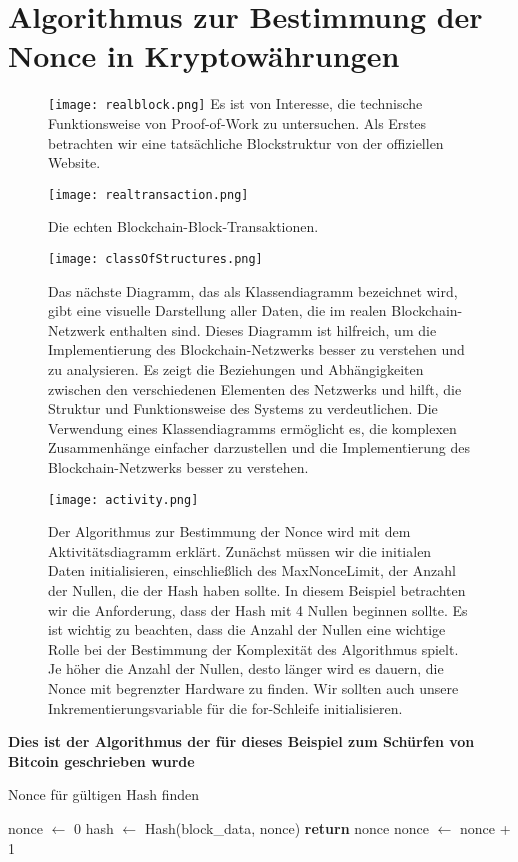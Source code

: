\documentclass[ngerman]{scrreprt}
\begin{document}
\section[Praktische Anwendung der Proof-Of-Work-Methode]{Algorithmus zur Bestimmung der Nonce in Kryptowährungen}
\begin{figure}[H]
	\texttt{[image: realblock.png]}
	\small{Es ist von Interesse, die technische Funktionsweise von Proof-of-Work zu untersuchen. Als Erstes betrachten wir eine tatsächliche Blockstruktur von der offiziellen Website.}
\end{figure}
\begin{figure}[H]
	\texttt{[image: realtransaction.png]}
	\caption{Die echten Blockchain-Block-Transaktionen.}
\end{figure}
\begin{figure}[H]
	\centering
	\texttt{[image: classOfStructures.png]}
	\caption{Das nächste Diagramm, das als Klassendiagramm bezeichnet wird, gibt eine visuelle Darstellung aller Daten, die im realen Blockchain-Netzwerk enthalten sind. Dieses Diagramm ist hilfreich, um die Implementierung des Blockchain-Netzwerks besser zu verstehen und zu analysieren. Es zeigt die Beziehungen und Abhängigkeiten zwischen den verschiedenen Elementen des Netzwerks und hilft, die Struktur und Funktionsweise des Systems zu verdeutlichen. Die Verwendung eines Klassendiagramms ermöglicht es, die komplexen Zusammenhänge einfacher darzustellen und die Implementierung des Blockchain-Netzwerks besser zu verstehen.}
\end{figure}
\newpage
\begin{figure}[H]
	\centering
	\texttt{[image: activity.png]}
	\caption{Der Algorithmus zur Bestimmung der Nonce wird mit dem Aktivitätsdiagramm erklärt. Zunächst müssen wir die initialen Daten initialisieren, einschließlich des MaxNonceLimit, der Anzahl der Nullen, die der Hash haben sollte. In diesem Beispiel betrachten wir die Anforderung, dass der Hash mit 4 Nullen beginnen sollte. Es ist wichtig zu beachten, dass die Anzahl der Nullen eine wichtige Rolle bei der Bestimmung der Komplexität des Algorithmus spielt. Je höher die Anzahl der Nullen, desto länger wird es dauern, die Nonce mit begrenzter Hardware zu finden. Wir sollten auch unsere Inkrementierungsvariable für die for-Schleife initialisieren.}
\end{figure}

\textbf{Dies ist der Algorithmus \textcommabelow der für dieses Beispiel zum Schürfen von Bitcoin geschrieben wurde} \\
\begin{algorithm}
	\caption{Nonce für gültigen Hash finden}
	\label{alg:nonce_find}
	
	\begin{algorithmic}[1]
		\State nonce $\gets$ 0
		\Repeat
		\State hash $\gets$ Hash(block\_data, nonce)
		\State \textbf{return} nonce
		\EndIf
		\State nonce $\gets$ nonce + 1
	\end{algorithmic}
\end{algorithm}
\end{document}
